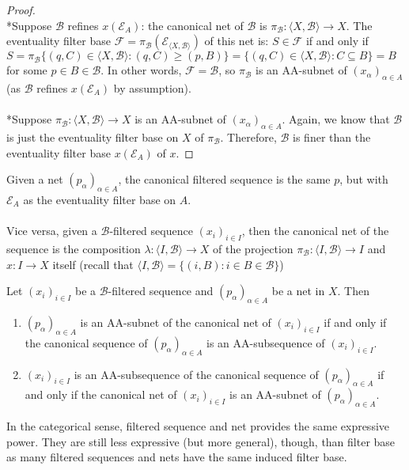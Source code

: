 \documentclass{treatise}
\begin{document}
\begin{proof} \ \\
*Suppose $\mathcal{B}$ refines $x(\mathcal{E}_A)$: the canonical net of $\mathcal{B}$ is $\pi_\mathcal{B}: \langle X, \mathcal{B} \rangle \to X$. The eventuality filter base $\mathcal{F} = \pi_\mathcal{B} (\mathcal{E}_{\langle X, \mathcal{B} \rangle})$ of this net is: $S \in \mathcal{F}$ if and only if $S = \pi_\mathcal{B} \{ (q, C) \in \langle X, \mathcal{B} \rangle: (q, C) \geq (p, B) \} = \{ (q, C) \in \langle X, \mathcal{B} \rangle: C \subseteq B \} = B$ for some $p \in B \in \mathcal{B}$. In other words, $\mathcal{F} = \mathcal{B}$, so $\pi_\mathcal{B}$ is an AA-subnet of $(x_\alpha)_{\alpha \in A}$ (as $\mathcal{B}$ refines $x(\mathcal{E}_A)$ by assumption).
\\
\\
*Suppose $\pi_\mathcal{B}: \langle X, \mathcal{B} \rangle \to X$ is an AA-subnet of $(x_\alpha)_{\alpha \in A}$. Again, we know that $\mathcal{B}$ is just the eventuality filter base on $X$ of $\pi_\mathcal{B}$. Therefore, $\mathcal{B}$ is finer than the eventuality filter base $x(\mathcal{E}_A)$ of $x$.
\end{proof}
\begin{remark}
Given a net $(p_\alpha)_{\alpha \in A}$, the canonical filtered sequence is the same $p$, but with $\mathcal{E}_A$ as the eventuality filter base on $A$.
\\
\\
Vice versa, given a $\mathcal{B}$-filtered sequence $(x_i)_{i \in I}$, then the canonical net of the sequence is the composition $\lambda: \langle I, \mathcal{B} \rangle \to X$ of the projection $\pi_\mathcal{B}: \langle I, \mathcal{B} \rangle \to I$ and $x: I \to X$ itself (recall that $\langle I, \mathcal{B} \rangle = \{ (i, B) : i \in B \in \mathcal{B} \}$)
\end{remark}
\begin{proposition}
Let $(x_i)_{i \in I}$ be a $\mathcal{B}$-filtered sequence and $(p_\alpha)_{\alpha \in A}$ be a net in $X$. Then
\begin{enumerate}
    \item $(p_\alpha)_{\alpha \in A}$ is an AA-subnet of the canonical net of $(x_i)_{i \in I}$ if and only if the canonical sequence of $(p_\alpha)_{\alpha \in A}$ is an AA-subsequence of $(x_i)_{i \in I}$.
    \item $(x_i)_{i \in I}$ is an AA-subsequence of the canonical sequence of $(p_\alpha)_{\alpha \in A}$ if and only if the canonical net of $(x_i)_{i \in I}$ is an AA-subnet of $(p_\alpha)_{\alpha \in A}$.
\end{enumerate}
In the categorical sense, filtered sequence and net provides the same expressive power. They are still less expressive (but more general), though, than filter base as many filtered sequences and nets have the same induced filter base.
\end{proposition}
\end{document}
